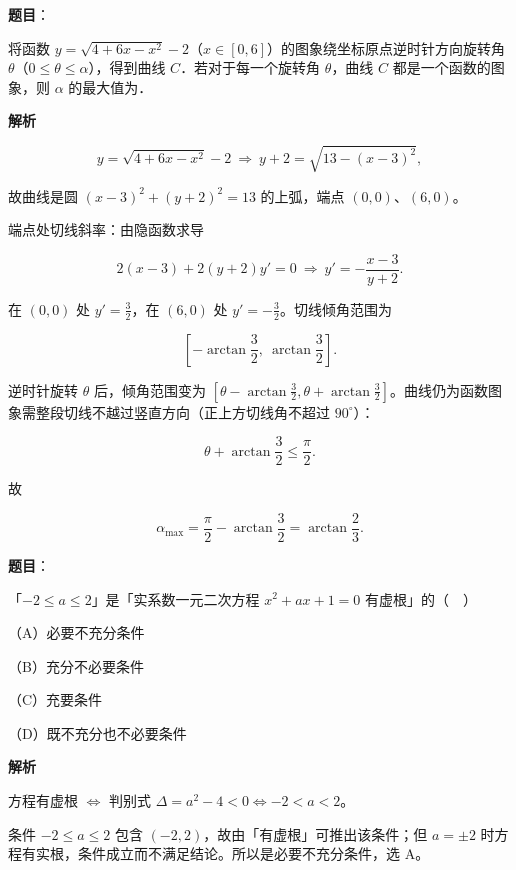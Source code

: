 \begin{answer}

\textbf{题目}：

将函数 $y=\sqrt{4+6x-x^2}-2$（$x\in[0,6]$）的图象绕坐标原点逆时针方向旋转角 $\theta$（$0\leqslant\theta\leqslant\alpha$），得到曲线 $C$．若对于每一个旋转角 $\theta$，曲线 $C$ 都是一个函数的图象，则 $\alpha$ 的最大值为\gkblank{}．

\textbf{解析}

\nopagebreak[4]
\[y=\sqrt{4+6x-x^2}-2\ \Longrightarrow\ y+2=\sqrt{13-(x-3)^2},\]

故曲线是圆 $(x-3)^2+(y+2)^2=13$ 的上弧，端点 $(0,0)$、$(6,0)$。

端点处切线斜率：由隐函数求导

\nopagebreak[4]
\[2(x-3)+2(y+2)y'=0\ \Longrightarrow\ y'=-\frac{x-3}{y+2}.\]

在 $(0,0)$ 处 $y'=\frac32$，在 $(6,0)$ 处 $y'=-\frac32$。切线倾角范围为

\nopagebreak[4]
\[\left[-\arctan\frac32,\ \arctan\frac32\right].\]

逆时针旋转 $\theta$ 后，倾角范围变为 $\left[\theta-\arctan\frac32,\theta+\arctan\frac32\right]$。曲线仍为函数图象需整段切线不越过竖直方向（正上方切线角不超过 $90^\circ$）：

\nopagebreak[4]
\[\theta+\arctan\frac32\leqslant\frac\pi2 .\]

故

\nopagebreak[4]
\[\alpha_{\max}=\frac\pi2-\arctan\frac32=\arctan\frac23 .\]


\end{answer}
\begin{answer}

\textbf{题目}：

「$-2\leqslant a\leqslant2$」是「实系数一元二次方程 $x^2+ax+1=0$ 有虚根」的（　）

（A）必要不充分条件

（B）充分不必要条件

（C）充要条件

（D）既不充分也不必要条件

\textbf{解析}

方程有虚根 $\iff$ 判别式 $\Delta=a^2-4<0\iff-2<a<2$。

条件 $-2\leqslant a\leqslant2$ 包含 $(-2,2)$，故由「有虚根」可推出该条件；但 $a=\pm2$ 时方程有实根，条件成立而不满足结论。所以是必要不充分条件，选 A。


\end{answer}
